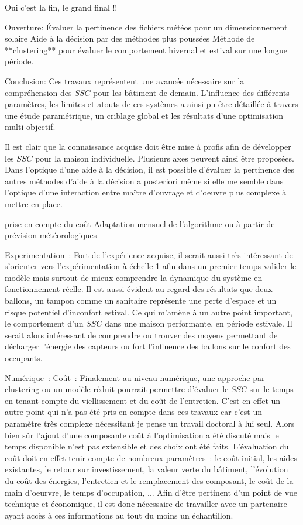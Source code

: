 


Oui c’est la fin, le grand final !!

Ouverture:
Évaluer la pertinence des fichiers météos pour un dimensionnement solaire
Aide à la décision par des méthodes plus poussées
Méthode de **clustering** pour évaluer le comportement hivernal et estival sur une
longue période.

Conclusion:
Ces travaux représentent une avancée nécessaire sur la compréhension des $SSC$ pour
les bâtiment de demain. L’influence des différents paramètres, les limites et atouts
de ces systèmes a ainsi pu être détaillée à travers une étude paramétrique, un criblage
global et les résultats d’une optimisation multi-objectif.

Il est clair que la connaissance acquise doit être mise à profis afin de développer
les $SSC$ pour la maison individuelle. Plusieurs axes peuvent ainsi être proposées.
Dans l’optique d’une aide à la décision, il est possible d’évaluer la pertinence
des autres méthodes d’aide à la décision a posteriori même si elle me semble dans
l’optique d’une interaction entre maître d’ouvrage et d’oeuvre plus complexe à mettre
en place.

prise en compte du coût
Adaptation mensuel de l’algorithme ou à partir de prévision météorologiques

Experimentation~:
Fort de l’expérience acquise, il serait aussi très intéressant de s’orienter vers
l’expérimentation à échelle 1 afin dans un premier temps valider le modèle mais surtout
de mieux comprendre la dynamique du système en fonctionnement réelle.
Il est aussi évident au regard des résultats que deux ballons, un tampon comme un sanitaire
représente une perte d’espace et un risque potentiel d’inconfort estival. Ce qui m’amène à
un autre point important, le comportement d’un $SSC$ dans une maison performante, en période
estivale. Il serait alors intéressant de comprendre ou trouver des moyens permettant de
décharger l’énergie des capteurs ou fort l’influence des ballons sur le confort des occupants.


Numérique~:
Coût~:
Finalement au niveau numérique, une approche par clustering ou un modèle réduit pourrait
permettre d’évaluer le $SSC$ sur le temps en tenant compte du viellissement et du coût
de l’entretien. C’est en effet un autre point qui n’a pas été pris en compte dans ces travaux
car c’est un paramètre très complexe nécessitant je pense un travail doctoral à lui seul.
Alors bien sûr l’ajout d’une composante coût à l’optimisation a été discuté mais le
temps disponible n’est pas extensible et des choix ont été faits.
L’évaluation du coût doit en effet tenir compte de nombreux paramètres~: le coût initial,
les aides existantes, le retour sur investissement, la valeur verte du bâtiment, l’évolution
du coût des énergies, l’entretien et le remplacement des composant, le coût de la main d’oeurvre,
le temps d’occupation, ...
Afin d’être pertinent d’un point de vue technique et économique, il est donc nécessaire
de travailler avec un partenaire ayant accès à ces informations au tout du moins un
échantillon.

